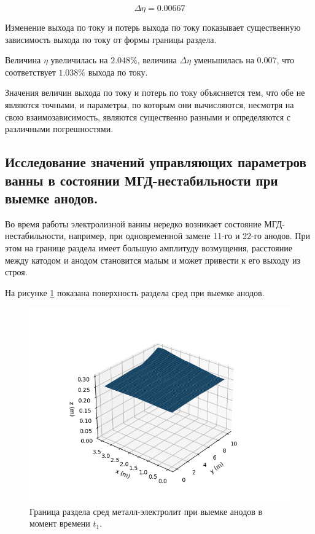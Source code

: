 \documentclass{article}
\begin{document}
\begin{equation}\label{eq:poterupotoku22}
\Delta \eta = 0.00667
\end{equation}

Изменение выхода по току и потерь выхода по току показывает существенную зависимость выхода по току от формы границы раздела.

Величина $\eta$ увеличилась на $2.048\%$, величина $\Delta \eta$ уменьшилась на $0.007$, что соответствует $1.038\%$ выхода по току.

Значения величин выхода по току и потерь по току объясняется тем, что обе не являются точными, и параметры, по которым они вычисляются, несмотря на свою взаимозависимость, являются существенно разными и определяются с различными погрешностями.

\subsection{Исследование значений управляющих параметров ванны в состоянии МГД-нестабильности при выемке анодов.}

Во время работы электролизной ванны нередко возникает состояние МГД-нестабильности, например, при одновременной замене 11-го и 22-го анодов. При этом на границе раздела имеет большую амплитуду возмущения, расстояние между катодом и анодом становится малым и может привести к его выходу из строя.

На рисунке \ref{fig:anodout} показана поверхность раздела сред при выемке анодов.

\begin{figure}[H]
\centering
\includegraphics[width=0.8\linewidth]{Surf1.png}
\caption{Граница раздела сред металл-электролит при выемке анодов в момент времени $t_1$. \label{fig:anodout}}
\end{figure}
\end{document}
